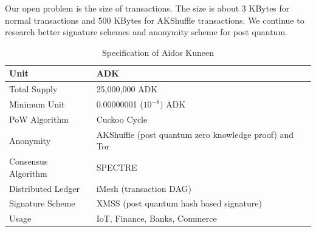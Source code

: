 \documentclass[a4paper,10pt,twocolumn]{article}
\begin{document}
Our open problem is the size of transactions. The size is about 3 KBytes for normal transactions and
500 KBytes for AKShuffle transactions. We continue to research better signature schemes and anonymity scheme
for post quantum.

\newpage
\begin{table}[htb]
	\caption{Specification of Aidos Kuneen}
    \label{tbl:spec}
	\begin{tabularx}{\linewidth}{XX} 
		\toprule
		Unit & ADK \\
		\midrule
Total Supply & 25,000,000 ADK \\ 
\midrule
Minimum Unit & 0.00000001 (\(10^{-8})\) ADK \\ 
\midrule
PoW Algorithm & Cuckoo Cycle\\ 
\midrule
Anonymity & AKShuffle (post quantum zero knowledge proof)  and Tor \\
\midrule
Consensus Algorithm & SPECTRE \\ \midrule
Distributed Ledger & iMesh (transaction DAG) \\
\midrule
Signature Scheme & XMSS (post quantum hash based signature)\\ 
\midrule
Usage &  IoT, Finance, Banks, Commerce \\ 
\bottomrule
\end{tabularx}
  \end{table}
\end{document}
